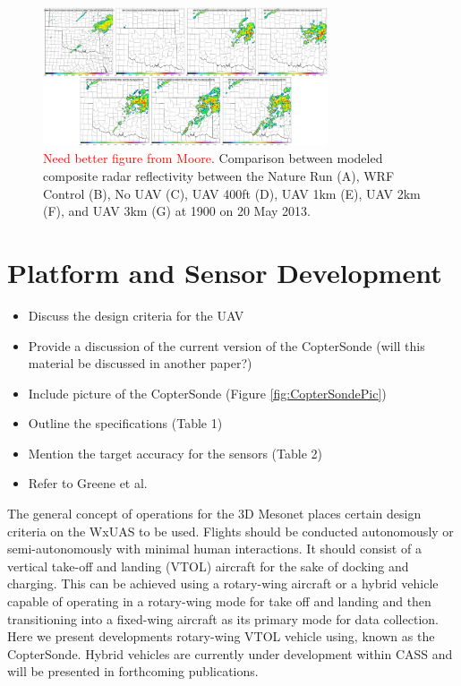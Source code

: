 \documentclass[sensors,review,submit,moreauthors,pdftex,10pt,a4paper]{mdpi}
\theoremstyle{mdpi}
\newcounter{ex}
\newcounter{re}
\theoremstyle{mdpidefinition}
\begin{document}
\begin{figure}
\centering
\includegraphics[angle=0, width=0.75\textwidth]{figures/OSSE2.pdf}
\caption{\label{fig:OSSE2} \textcolor{red}{Need better figure from Moore}. Comparison between modeled composite radar reflectivity between the Nature Run (A), WRF Control (B), No UAV (C), UAV 400ft (D), UAV 1km (E), UAV 2km (F), and UAV 3km (G) at 1900 on 20 May 2013.}
\end{figure}

\section{Platform and Sensor Development}
\begin{itemize}[leftmargin=*,labelsep=4mm]
\color{blue}
\item	Discuss the design criteria for the UAV
\item	Provide a discussion of the current version of the CopterSonde (will this material be discussed in another paper?)
\item	Include picture of the CopterSonde (Figure \ref{fig:CopterSondePic})
\item	Outline the specifications (Table 1)
\item	Mention the target accuracy for the sensors (Table 2)
\item	Refer to Greene et al.
\end{itemize}

The general concept of operations for the 3D Mesonet places certain design criteria on the WxUAS to be used. Flights should be conducted autonomously or semi-autonomously with minimal human interactions. It should consist of a vertical take-off and landing (VTOL) aircraft for the sake of docking and charging. This can be achieved using a rotary-wing aircraft or a hybrid vehicle capable of operating in a rotary-wing mode for take off and landing and then transitioning into a fixed-wing aircraft as its primary mode for data collection. Here we present developments rotary-wing VTOL vehicle using, known as the CopterSonde. Hybrid vehicles are currently under development within CASS and will be presented in forthcoming publications.
\end{document}
